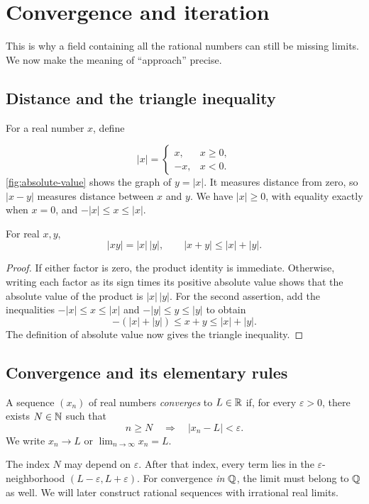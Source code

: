 \section{Convergence and iteration}
\label{sec:analysis-i:convergence-preview}

This is why a field containing all the rational numbers can still be
missing limits. We now make the meaning of ``approach'' precise.

\subsection{Distance and the triangle inequality}
For a real number $x$, define
\begin{marginfigure}
  \centering
  
  \caption[The absolute value function.]{The graph of $y=|x|$ consists
    of the ray $y=-x$ for $x\leq0$ and the ray $y=x$ for $x\geq0$.
    Its vertex is the origin.}
  \label{fig:absolute-value}
\end{marginfigure}
\[
  |x|=\begin{cases}
    x,&x\geq0,\\
    -x,&x<0.
  \end{cases}
\]
\autoref{fig:absolute-value} shows the graph of $y=|x|$.
It measures distance from zero, so $|x-y|$ measures distance between
$x$ and $y$. We have $|x|\geq0$, with equality exactly when $x=0$,
and $-|x|\leq x\leq|x|$.

\begin{proposition}
  \label{thm:analysis-i:absolute-value-inequalities}
  For real $x,y$,
  \[
    |xy|=|x|\,|y|,\qquad |x+y|\leq|x|+|y|.
  \]
\end{proposition}
\begin{proof}
  If either factor is zero, the product identity is immediate.
  Otherwise, writing each factor as its sign times its positive absolute
  value shows that the absolute value of the product is $|x|\,|y|$.
  For the second assertion, add the inequalities
  $-|x|\leq x\leq|x|$ and $-|y|\leq y\leq|y|$ to obtain
  \[
    -(|x|+|y|)\leq x+y\leq |x|+|y|.
  \]
  The definition of absolute value now gives the triangle inequality.
\end{proof}

\subsection{Convergence and its elementary rules}
\begin{definition}
  A sequence $(x_n)$ of real numbers \emph{converges} to $L\in\mathbb{R}$ if,
  for every $\varepsilon>0$, there exists $N\in\mathbb{N}$ such that
  \[
    n\geq N\quad\Longrightarrow\quad |x_n-L|<\varepsilon.
  \]
  We write $x_n\to L$ or $\lim_{n\to\infty}x_n=L$.
\end{definition}
The index $N$ may depend on $\varepsilon$. After that index, every term
lies in the $\varepsilon$-neighborhood $(L-\varepsilon,L+\varepsilon)$.
For convergence \emph{in $\mathbb{Q}$}, the limit must belong to $\mathbb{Q}$ as well.
We will later construct rational sequences with irrational real limits.

